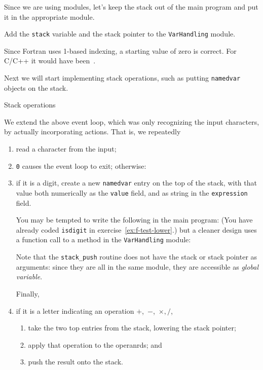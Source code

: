 Since we are using modules, let's keep the stack out of the main program
and put it in the appropriate module.

\begin{exercise}
  \label{ex:f-stack-in-mod}
  Add the \lstinline{stack} variable and the stack pointer
  to the \lstinline{VarHandling} module.
\end{exercise}

Since Fortran uses 1-based indexing,
a starting value of zero is correct.
For C/C++ it would have been~.

Next we will start implementing stack operations,
such as putting \lstinline{namedvar} objects on the stack.

 {Stack operations}

We extend the above event loop,
which was only recognizing the input characters,
by actually incorporating actions.
That is, we repeatedly
\begin{enumerate}
\item read a character from the input;
\item \lstinline{0} causes the event loop to exit; otherwise:
\item if it is a digit, create a new \lstinline{namedvar} entry
  on the top of the stack, with that value both numerically as the
  \lstinline{value} field, and as string in the \lstinline{expression} field.

  You may be tempted to write the following in the main program:
  (You have already coded \lstinline{isdigit} in exercise~\ref{ex:f-test-lower}.)
  but a cleaner design uses a function call
  to a method in the \lstinline{VarHandling} module:
  \begin{multicols}{2}
    \columnbreak
  \end{multicols}
  Note that the \lstinline{stack_push} routine does not have the stack
  or stack pointer as arguments: since they are all in the same module,
  they are accessible as
  \emph{global variable}.

  Finally,
\item if it is a letter indicating an operation $+$,~$-$,~$\times,/$,
  \begin{enumerate}
  \item take the two top entries from the stack, lowering the stack pointer;
  \item apply that operation to the operanrds; and
  \item push the result onto the stack.
  \end{enumerate}
\end{enumerate}

